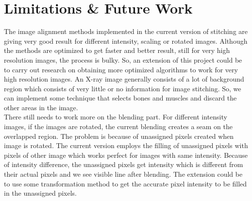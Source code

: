 \chapter{Limitations \& Future Work}

The image alignment methods implemented in the current version of stitching are giving very good result for different intensity, scaling or rotated images. Although the methods are optimized to get faster and better result, still for very high resolution images, the process is bulky. So, an extension of this project could be to carry out research on obtaining more optimized algorithms to work for very high resolution images. An X-ray image generally consists of a lot of background region which consists of very little or no information for image stitching. So, we can implement some technique that selects bones and muscles and discard the other areas in the image.\\

\noindent There still needs to work more on the blending part. For different intensity images, if the images are rotated, the current blending creates a seam on the overlapped region. The problem is because of unassigned pixels created when image is rotated. The current version employs the filling of unassigned pixels with pixels of other image which works perfect for images with same intensity. Because of intensity difference, the unassigned pixels get intensity which is different from their actual pixels and we see visible line after blending. The extension could be to use some transformation method to get the accurate pixel intensity to be filled in the unassigned pixels.

